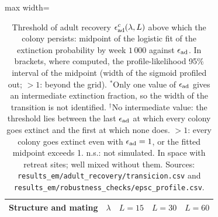\begin{table}[ht]
\centering
\caption{Threshold of adult recovery $\epsilon_{\rm ad}^c(\lambda,L)$ above which the colony persists: midpoint of the logistic
fit of the extinction probability by week $1\,000$ against $\epsilon_{\rm ad}$. In brackets, where computed, the
profile-likelihood 95\% interval of the midpoint (width of the sigmoid profiled out; $>1$: beyond the grid).
$^\ast$Only one value of $\epsilon_{\rm ad}$ gives an intermediate extinction fraction, so the width of the transition is not
identified. $^\dagger$No intermediate value: the threshold lies between the last $\epsilon_{\rm ad}$ at which every colony goes
extinct and the first at which none does. $>1$: every colony goes extinct even with $\epsilon_{\rm ad}=1$, or the fitted
midpoint exceeds 1. n.s.: not simulated. In space with retreat sites; well mixed without them. Sources:
\texttt{results\_em/adult\_recovery/transicion.csv} and
\texttt{results\_em/robustness\_checks/epsc\_profile.csv}.}
\label{tab:sm-epsc}
\footnotesize
\begin{adjustbox}{max width=\textwidth}
\begin{tabular}{@{}lcccc@{}}
\toprule
Structure and mating & $\lambda$ & $L=15$ & $L=30$ & $L=60$ \\
\midrule

\end{tabular}
\end{adjustbox}
\end{table}

